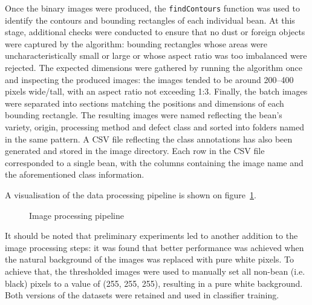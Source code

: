Once the binary images were produced, the \verb|findContours| function was used to identify the contours and
bounding rectangles of each individual bean.
At this stage, additional checks were conducted to ensure that no dust or foreign objects were captured by the algorithm:
bounding rectangles whose areas were uncharacteristically small or large or whose aspect ratio was too imbalanced were rejected.
The expected dimensions were gathered by running the algorithm once and inspecting the produced images: the images tended
to be around 200--400 pixels wide/tall, with an aspect ratio not exceeding 1:3.
Finally, the batch images were separated into sections matching the positions and dimensions of each bounding rectangle.
The resulting images were named reflecting the bean's variety, origin, processing method and defect class and sorted into folders
named in the same pattern.
A CSV file reflecting the class annotations has also been generated and stored in the image directory.
Each row in the CSV file corresponded to a single bean, with the columns containing the image name and the
aforementioned class information.

A visualisation of the data processing pipeline is shown on figure~\ref{fig:imgProcessing}.

\begin{figure}[h]
    \centering
    \caption{Image processing pipeline}
    \label{fig:imgProcessing}
\end{figure}

It should be noted that preliminary experiments led to another addition to the image processing steps:
it was found that better performance was achieved when the natural background of the images was replaced with pure white pixels.
To achieve that, the thresholded images were used to manually set all non-bean (i.e. black) pixels to a value of (255, 255, 255),
resulting in a pure white background.
Both versions of the datasets were retained and used in classifier training.

